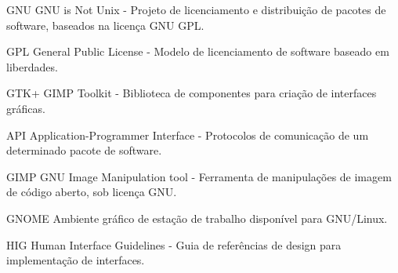 \begin{siglas}
  \item[GNU] GNU is Not Unix - Projeto de licenciamento e distribuição de pacotes de software, baseados na licença GNU GPL.
  \item[GPL] General Public License - Modelo de licenciamento de software baseado em liberdades.
  \item[GTK+] GIMP Toolkit - Biblioteca de componentes para criação de interfaces gráficas.
  \item[API] Application-Programmer Interface - Protocolos de comunicação de um determinado pacote de software.
  \item[GIMP] GNU Image Manipulation tool - Ferramenta de manipulações de imagem de código aberto, sob licença GNU.
  \item[GNOME] Ambiente gráfico de estação de trabalho disponível para GNU/Linux.
  \item[HIG] Human Interface Guidelines - Guia de referências de design para implementação de interfaces.
\end{siglas}
